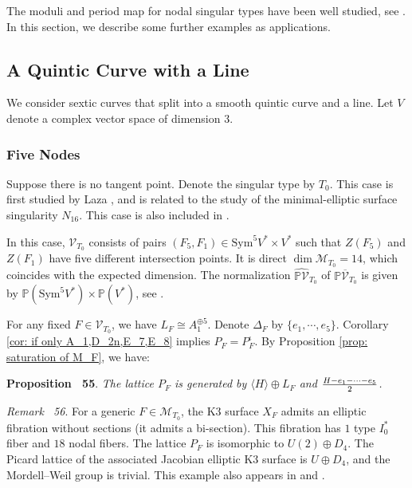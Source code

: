 \documentclass[
]{article}
\begin{document}
The moduli and period map for nodal singular types have been well
studied, see \cite{yu2023moduli}. In this section, we describe some
further examples as applications.

\subsection{A Quintic Curve with a
Line}\label{a-quintic-curve-with-a-line}

We consider sextic curves that split into a smooth quintic curve and a
line. Let \(V\) denote a complex vector space of dimension \(3\).

\subsubsection{Five Nodes}\label{five-nodes}

Suppose there is no tangent point. Denote the singular type by \(T_0\).
This case is first studied by Laza \cite{laza2009deformations}, and is
related to the study of the minimal-elliptic surface singularity
\(N_{16}\). This case is also included in \cite{yu2023moduli}.

In this case, \(\mathcal{V}_{T_0}\) consists of pairs
\((F_5,F_1)\in \mathrm{Sym}^5 V^*\times V^*\) such that \(Z(F_5)\) and
\(Z(F_1)\) have five different intersection points. It is direct
\(\dim \mathcal{M}_{T_0}=14\), which coincides with the expected
dimension. The normalization \(\widehat{\mathbb{P}\mathcal{V}}_{T_0}\)
of \(\mathbb{P}\overline{\mathcal{V}}_{T_0}\) is given by
\(\mathbb{P}(\mathrm{Sym}^5 V^*) \times \mathbb{P}(V^*)\), see
\cite[\S 4.2]{yu2023moduli}.

For any fixed \(F\in\mathcal{V}_{T_0}\), we have
\(L_F\cong A_1^{\oplus 5}\). Denote \(\Delta_F\) by
\(\{ e_1,\cdots,e_5 \}\). Corollary \ref{cor: if only A_1,D_2n,E_7,E_8}
implies \(P_F=P_F^{\iota}\). By Proposition
\ref{prop: saturation of M_F}, we have:

\textbf{Proposition~ 55}. \emph{The lattice \(P_F\) is generated by
\(\langle H\rangle\oplus L_F\) and \({H-e_1-\cdots-e_5\over2}\).}

\emph{Remark~ 56}. For a generic \(F\in\mathcal{M}_{T_0}\), the K3
surface \(X_F\) admits an elliptic fibration without sections (it admits
a bi-section). This fibration has \(1\) type \(I_0^*\) fiber and \(18\)
nodal fibers. The lattice \(P_F\) is isomorphic to \(U(2)\oplus D_4\).
The Picard lattice of the associated Jacobian elliptic K3 surface is
\(U\oplus D_4\), and the Mordell--Weil group is trivial. This example
also appears in \cite[Table 1.1, No. 6]{belcastro2002picard} and
\cite[Table 2]{clingher2024neron-severi}.
\end{document}
